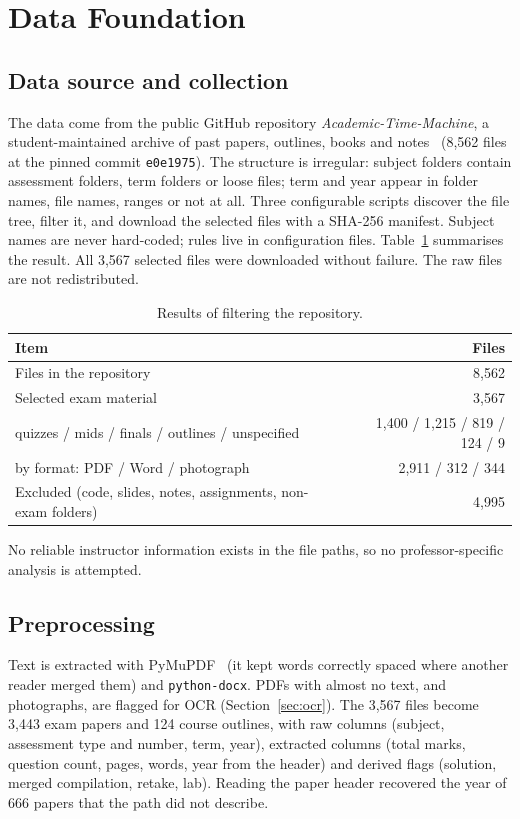 \documentclass[11pt,a4paper]{article}
\begin{document}
\section{Data Foundation}
\label{sec:data}

\subsection{Data source and collection}
The data come from the public GitHub repository \emph{Academic-Time-Machine}, a student-maintained archive of past papers,
outlines, books and notes~\cite{atm} (8{,}562 files at the pinned commit \texttt{e0e1975}). The structure is irregular: subject folders
contain assessment folders, term folders or loose files; term and year appear in folder names, file names, ranges or not at
all. Three configurable scripts discover the file tree, filter it, and download the selected files with a SHA-256 manifest.
Subject names are never hard-coded; rules live in configuration files. Table~\ref{tab:collection} summarises the result.
All 3{,}567 selected files were downloaded without failure. The raw files are not redistributed.

\begin{table}[!htb]
\centering
\small
\begin{tabular}{lr}
\toprule
Item & Files \\
\midrule
Files in the repository & 8{,}562 \\
Selected exam material & 3{,}567 \\
\quad quizzes / mids / finals / outlines / unspecified & 1{,}400 / 1{,}215 / 819 / 124 / 9 \\
\quad by format: PDF / Word / photograph & 2{,}911 / 312 / 344 \\
Excluded (code, slides, notes, assignments, non-exam folders) & 4{,}995 \\
\bottomrule
\end{tabular}
\caption{Results of filtering the repository.}
\label{tab:collection}
\end{table}

No reliable instructor information exists in the file paths, so no professor-specific analysis is attempted.

\subsection{Preprocessing}
Text is extracted with PyMuPDF~\cite{pymupdf} (it kept words correctly spaced where another reader merged them) and \texttt{python-docx}.
PDFs with almost no text, and photographs, are flagged for OCR (Section~\ref{sec:ocr}). The 3{,}567 files become 3{,}443
exam papers and 124 course outlines, with raw columns (subject, assessment type and number, term, year), extracted columns
(total marks, question count, pages, words, year from the header) and derived flags (solution, merged compilation, retake, lab).
Reading the paper header recovered the year of 666 papers that the path did not describe.
\end{document}
